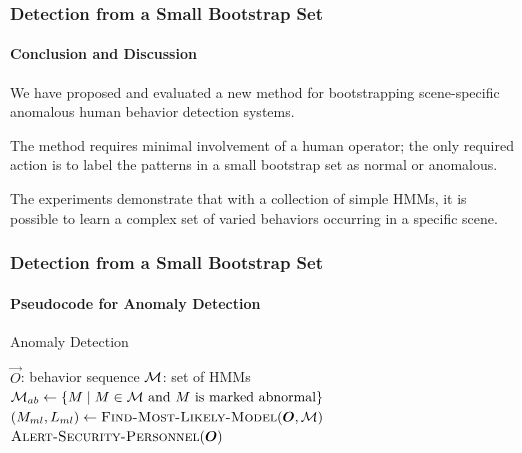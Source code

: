 
\else

\begin{frame}
    \frametitle{Detection from a Small Bootstrap Set}
    \framesubtitle{Conclusion and Discussion}

    We have proposed and evaluated a new method for bootstrapping 
    scene-specific anomalous human behavior detection systems. 
    
    \bigskip
    
    The method requires minimal involvement of a human operator; the 
    only required action is to label the patterns in a small bootstrap 
    set as normal or anomalous. 

    \bigskip

    The experiments demonstrate that with a collection of simple HMMs, 
    it is possible to learn a complex set of varied behaviors occurring 
    in a specific scene. 

\end{frame}


\begin{frame}
    \frametitle{Detection from a Small Bootstrap Set}
    \framesubtitle{Pseudocode for Anomaly Detection}

    \begin{algorithm}[H]
        \caption{Anomaly Detection}
        \begin{algorithmic}
            \REQUIRE $\vec{O}$: behavior sequence
            \REQUIRE ${\cal M}$: set of HMMs
            \STATE ${\cal M}_{ab} \gets \{ M \mid M \in {\cal M} \text{~and $M$ is marked abnormal} \}$
            \STATE $( M_{ml}, L_{ml} ) \gets \textsc{Find-Most-Likely-Model}(\vec{O}, {\cal M})$
                \STATE $\textsc{Alert-Security-Personnel}(\vec{O})$
            \ENDIF
        \end{algorithmic}
    \end{algorithm}

\end{frame}

\fi


